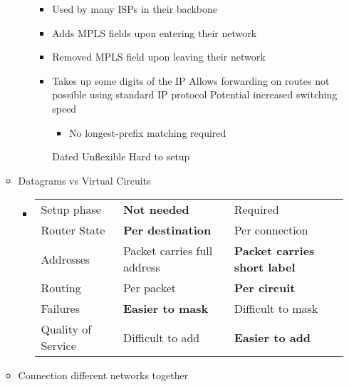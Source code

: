 \begin{itemize}
\begin{itemize}
\begin{itemize}
\begin{itemize}
                            \item Used by many ISPs in their backbone
                            \item Adds MPLS fields upon entering their network
                            \item Removed MPLS field upon leaving their network
                            \item Takes up some digits of the IP
                            \ipro Allows forwarding on routes not possible using standard IP protocol
                            \ipro Potential increased switching speed
                                \begin{itemize}
                                    \item No longest-prefix matching required
                                \end{itemize}
                            \icon Dated
                            \icon Unflexible
                            \icon Hard to setup
                        \end{itemize}
                \end{itemize}
            \item Datagrams vs Virtual Circuits
                \begin{itemize}
                    \item
                    \begin{tabular}{| l | l | l |}
                        Setup phase & \textbf{Not needed} & Required\\
                        Router State & \textbf{Per destination} & Per connection\\
                        Addresses & Packet carries full address & \textbf{Packet carries short label}\\
                        Routing & Per packet & \textbf{Per circuit}\\
                        Failures & \textbf{Easier to mask} & Difficult to mask\\
                        Quality of Service & Difficult to add & \textbf{Easier to add}\\
                    \end{tabular}
                \end{itemize}
        \end{itemize}
        \begin{itemize}
            \item Connection different networks together

\end{itemize}
\end{itemize}
